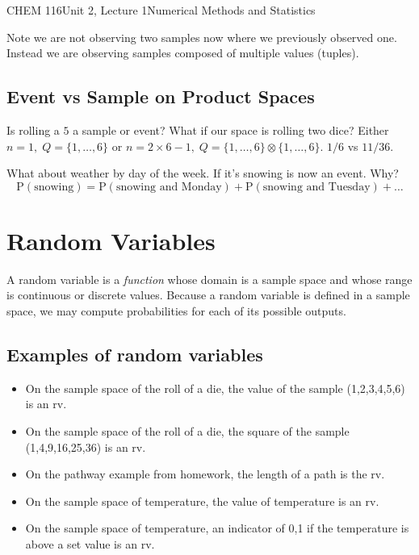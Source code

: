 \documentclass{article}
\renewcommand{\Pr}{\textrm{P}}
\begin{document}
\begin{tdoc}{CHEM 116}{Unit 2, Lecture 1}{Numerical Methods and Statistics}
\begin{itemize}
\end{itemize}

Note we are not observing two samples now where we previously observed
one. Instead we are observing samples composed of multiple values
(tuples).

\subsection{Event vs Sample on Product Spaces}
Is rolling a $5$ a sample or event? What if our space is rolling two
dice? Either $n=1,\; Q=\{1,\ldots,6\}$ or $n=2\times 6 - 1,\; Q=\{1,\ldots,6\} \otimes \{1,\ldots,6\}$.
$1/6$ vs $11/36$.

What about weather by day of the week. If it's snowing is now an
event. Why?
\[
\Pr(\textrm{snowing}) = \Pr(\textrm{snowing and Monday}) + \Pr(\textrm{snowing and Tuesday}) + \ldots
\]

\section{Random Variables}

A random variable is a \emph{function} whose domain is a sample space
and whose range is continuous or discrete values. Because a random
variable is defined in a sample space, we may compute probabilities
for each of its possible outputs.

\subsection{Examples of random variables}

\begin{itemize}

\item On the sample space of the roll of a die, the value of the
  sample (1,2,3,4,5,6) is an rv.


\item On the sample space of the roll of a die, the square of the
  sample (1,4,9,16,25,36) is an rv.

\item On the pathway example from homework, the
  length of a path is the rv.

\item On the sample space of temperature, the value of
  temperature is an rv.

\item On the sample space of temperature, an indicator of 0,1 if the
  temperature is above a set value is an rv.


\end{itemize}
\end{tdoc}
\end{document}
